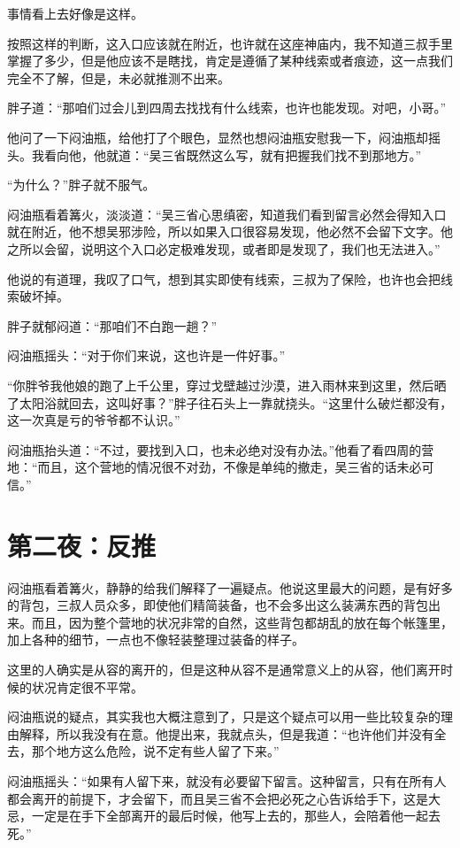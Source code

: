 事情看上去好像是这样。

按照这样的判断，这入口应该就在附近，也许就在这座神庙内，我不知道三叔手里掌握了多少，但是他应该不是瞎找，肯定是遵循了某种线索或者痕迹，这一点我们完全不了解，但是，未必就推测不出来。

胖子道：“那咱们过会儿到四周去找找有什么线索，也许也能发现。对吧，小哥。”

他问了一下闷油瓶，给他打了个眼色，显然也想闷油瓶安慰我一下，闷油瓶却摇头。我看向他，他就道：“吴三省既然这么写，就有把握我们找不到那地方。”

“为什么？”胖子就不服气。

闷油瓶看着篝火，淡淡道：“吴三省心思缜密，知道我们看到留言必然会得知入口就在附近，他不想吴邪涉险，所以如果入口很容易发现，他必然不会留下文字。他之所以会留，说明这个入口必定极难发现，或者即是发现了，我们也无法进入。”

他说的有道理，我叹了口气，想到其实即使有线索，三叔为了保险，也许也会把线索破坏掉。

胖子就郁闷道：“那咱们不白跑一趟？”

闷油瓶摇头：“对于你们来说，这也许是一件好事。”

“你胖爷我他娘的跑了上千公里，穿过戈壁越过沙漠，进入雨林来到这里，然后晒了太阳浴就回去，这叫好事？”胖子往石头上一靠就挠头。“这里什么破烂都没有，这一次真是亏的爷爷都不认识。”

闷油瓶抬头道：“不过，要找到入口，也未必绝对没有办法。”他看了看四周的营地：“而且，这个营地的情况很不对劲，不像是单纯的撤走，吴三省的话未必可信。”

\chapter{第二夜：反推}

闷油瓶看着篝火，静静的给我们解释了一遍疑点。他说这里最大的问题，是有好多的背包，三叔人员众多，即使他们精简装备，也不会多出这么装满东西的背包出来。而且，因为整个营地的状况非常的自然，这些背包都胡乱的放在每个帐篷里，加上各种的细节，一点也不像轻装整理过装备的样子。

这里的人确实是从容的离开的，但是这种从容不是通常意义上的从容，他们离开时候的状况肯定很不平常。

闷油瓶说的疑点，其实我也大概注意到了，只是这个疑点可以用一些比较复杂的理由解释，所以我没有在意。他提出来，我就点头，但是我道：“也许他们并没有全去，那个地方这么危险，说不定有些人留了下来。”

闷油瓶摇头：“如果有人留下来，就没有必要留下留言。这种留言，只有在所有人都会离开的前提下，才会留下，而且吴三省不会把必死之心告诉给手下，这是大忌，一定是在手下全部离开的最后时候，他写上去的，那些人，会陪着他一起去死。”

